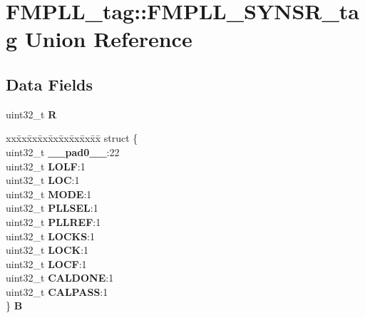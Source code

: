 \hypertarget{unionFMPLL__tag_1_1FMPLL__SYNSR__tag}{}\section{F\+M\+P\+L\+L\+\_\+tag\+::F\+M\+P\+L\+L\+\_\+\+S\+Y\+N\+S\+R\+\_\+tag Union Reference}
\label{unionFMPLL__tag_1_1FMPLL__SYNSR__tag}
\subsection*{Data Fields}
\begin{DoxyCompactItemize}
\item 
\mbox{\label{unionFMPLL__tag_1_1FMPLL__SYNSR__tag_af7b9be5a8a9058d79b283aad73597a88}} 
uint32\+\_\+t {\bfseries R}
\item 
\mbox{\label{unionFMPLL__tag_1_1FMPLL__SYNSR__tag_a9f5a16a36ef1cf91d90fb8bdaf5e55f8}} 
\begin{tabbing}
xx\=xx\=xx\=xx\=xx\=xx\=xx\=xx\=xx\=\kill
struct \{\\
\>uint32\_t {\bfseries \_\_pad0\_\_}:22\\
\>uint32\_t {\bfseries LOLF}:1\\
\>uint32\_t {\bfseries LOC}:1\\
\>uint32\_t {\bfseries MODE}:1\\
\>uint32\_t {\bfseries PLLSEL}:1\\
\>uint32\_t {\bfseries PLLREF}:1\\
\>uint32\_t {\bfseries LOCKS}:1\\
\>uint32\_t {\bfseries LOCK}:1\\
\>uint32\_t {\bfseries LOCF}:1\\
\>uint32\_t {\bfseries CALDONE}:1\\
\>uint32\_t {\bfseries CALPASS}:1\\
\} {\bfseries B}\\


\end{tabbing}
\end{DoxyCompactItemize}

